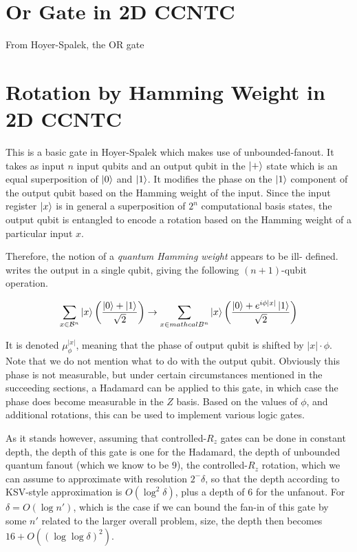 \documentclass{article}
\begin{document}
\section{Or Gate in 2D CCNTC}

From Hoyer-Spalek, the OR gate 

\section{Rotation by Hamming Weight in 2D CCNTC}

This is a basic gate in Hoyer-Spalek which makes use of unbounded-fanout.
It takes as input $n$ input qubits and an output qubit in the
$\left\vert{+}\right\rangle$ state which is an equal superposition of $\left\vert{0}\right\rangle$ and $\left\vert{1}\right\rangle$.
It modifies the phase on the $\left\vert{1}\right\rangle$ component of the output qubit 
based on the Hamming weight of the input. Since the input register $\left\vert{x}\right\rangle$
is in general a superposition of $2^n$ computational basis states, the
output qubit is entangled to encode a rotation based on the Hamming weight
of a particular input $x$.

Therefore, the notion of a \emph{quantum Hamming weight} appears to be ill-
defined.
writes the output in a single
qubit, giving the following $(n+1)$-qubit operation.

\begin{equation}
\sum_{x \in \mathcal{B}^n} \left\vert{x}\right\rangle\left(\frac{\left\vert{0}\right\rangle + \left\vert{1}\right\rangle}{\sqrt{2}}\right)
\rightarrow
\sum_{x \in mathcal{B}^n} \left\vert{x}\right\rangle\left(\frac{\left\vert{0}\right\rangle + e^{i\phi|x|}\left\vert{1}\right\rangle}{\sqrt{2}}\right)
\end{equation}

It is denoted $\mu^{|x|}_\phi$, meaning that the phase of output qubit
is shifted by $|x|\cdot \phi$. Note that we do not mention what to do
with the output qubit. Obviously this phase is not measurable, but under
certain circumstances mentioned in the succeeding sections, a Hadamard
can be applied to this gate, in which case the phase does become
measurable in the $Z$ basis. Based on the values of $\phi$, and additional
rotations, this can be used to implement various logic gates.

As it stands however, assuming that controlled-$R_z$ gates can be done
in constant depth, the depth of this gate is one for the Hadamard,
the depth of unbounded quantum fanout (which we know to be $9$), the
controlled-$R_z$ rotation, which we can assume to approximate with
resolution $2^-\delta$, so that the depth according to KSV-style
approximation is $O(\log^2 \delta)$, plus a depth of $6$ for the
unfanout. For $\delta = O(\log n')$, which is the case if we can
bound the fan-in of this gate by some $n'$ related to the larger
overall problem, size, the depth then becomes $16 + O((\log\log \delta)^2)$.
\end{document}
